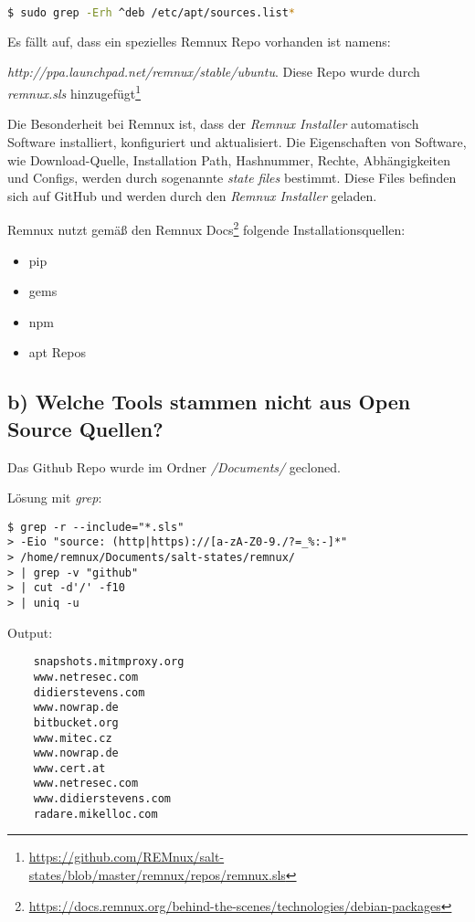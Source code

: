 \begin{lstlisting}[language=bash]
  $ sudo grep -Erh ^deb /etc/apt/sources.list*
\end{lstlisting}
Es fällt auf, dass ein spezielles Remnux Repo vorhanden ist namens:

\mbox{\textit{http://ppa.launchpad.net/remnux/stable/ubuntu}}. Diese Repo wurde durch \textit{remnux.sls} hinzugefügt\footnote{\url{https://github.com/REMnux/salt-states/blob/master/remnux/repos/remnux.sls}}

Die Besonderheit bei Remnux ist, dass der \textit{Remnux Installer} automatisch Software installiert, konfiguriert und aktualisiert.
Die Eigenschaften von Software, wie Download-Quelle, Installation Path, Hashnummer, Rechte, Abhängigkeiten und Configs, werden durch sogenannte \textit{state files} bestimmt.
Diese Files befinden sich auf GitHub und werden durch den \textit{Remnux Installer} geladen.

Remnux nutzt gemäß den Remnux Docs\footnote{\url{https://docs.remnux.org/behind-the-scenes/technologies/debian-packages}} folgende Installationsquellen:
\begin{itemize}
    \item pip
    \item gems
    \item npm
    \item apt Repos
\end{itemize}

\subsection*{b) Welche Tools stammen nicht aus Open Source Quellen?}

Das Github Repo wurde im Ordner \textit{/Documents/} gecloned.

Lösung mit \textit{grep}:

\begin{lstlisting}
$ grep -r --include="*.sls"
> -Eio "source: (http|https)://[a-zA-Z0-9./?=_%:-]*"
> /home/remnux/Documents/salt-states/remnux/
> | grep -v "github"
> | cut -d'/' -f10
> | uniq -u
\end{lstlisting}

Output:
\begin{lstlisting}
    snapshots.mitmproxy.org
    www.netresec.com
    didierstevens.com
    www.nowrap.de
    bitbucket.org
    www.mitec.cz
    www.nowrap.de
    www.cert.at
    www.netresec.com
    www.didierstevens.com
    radare.mikelloc.com
\end{lstlisting}

